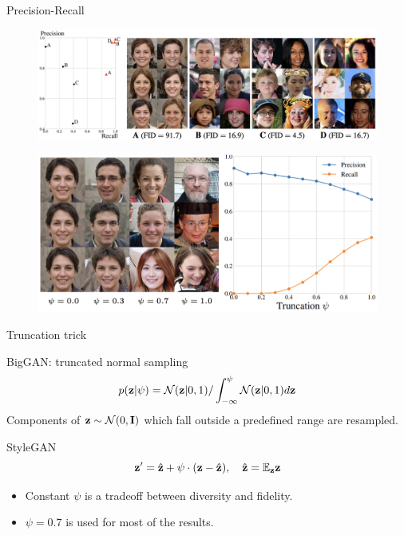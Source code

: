 \begin{frame}{Precision-Recall}
	\begin{figure}
		\includegraphics[width=\linewidth]{figs/pr_vs_fid}
	\end{figure}
	\begin{figure}
		\includegraphics[width=0.75\linewidth]{figs/pr_truncation}
	\end{figure}
\end{frame}
\begin{frame}{Truncation trick}
	\begin{block}{BigGAN: truncated normal sampling}
		\vspace{-0.3cm}
		\[
			p(\mathbf{z} | \psi) = \mathcal{N}(\mathbf{z} | 0, 1) / \int_{-\infty}^\psi \mathcal{N}(\mathbf{z} | 0, 1) d\mathbf{z}
		\]
		Components of $\mathbf{z} \sim \mathcal{N}(0, \mathbf{I})$ which fall outside a predefined range are resampled.
	\end{block}
	
	\begin{block}{StyleGAN}
		\vspace{-0.2cm}
		\[
			\mathbf{z}' = \hat{\mathbf{z}} + \psi \cdot (\mathbf{z} - \hat{\mathbf{z}}), \quad \hat{\mathbf{z}} = \mathbb{E}_{\mathbf{z}} \mathbf{z}
		\]
		\vspace{-0.2cm}
		\begin{itemize}
			\item Constant $\psi$ is a tradeoff between diversity and fidelity. 
			\item $\psi=0.7$ is used for most of the results.
		\end{itemize}
	\end{block}

\end{frame}
